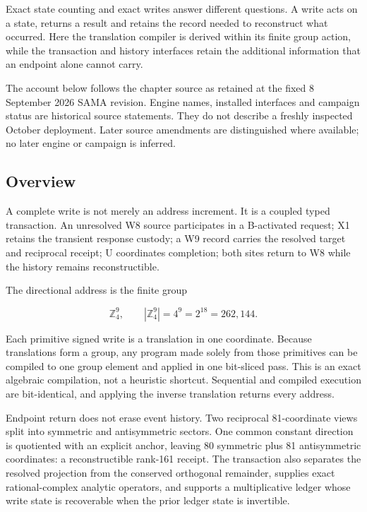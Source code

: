 \label{viii-ch04-the-algebra-of-a-complete-write}

Exact state counting and exact writes answer different questions. A
write acts on a state, returns a result and retains the record needed to
reconstruct what occurred. Here the translation compiler is derived
within its finite group action, while the transaction and history
interfaces retain the additional information that an endpoint alone
cannot carry.

The account below follows the chapter source as retained at the fixed 8
September 2026 SAMA revision. Engine names, installed interfaces and
campaign status are historical source statements. They do not describe a
freshly inspected October deployment. Later source amendments are
distinguished where available; no later engine or campaign is inferred.

\subsection{Overview}\label{viii-ch04-overview}

A complete write is not merely an address increment. It is a coupled
typed transaction. An unresolved W8 source participates in a B-activated
request; X1 retains the transient response custody; a W9 record carries
the resolved target and reciprocal receipt; U coordinates completion;
both sites return to W8 while the history remains reconstructible.

The directional address is the finite group

\[
\mathbb Z_4^9,
\qquad |\mathbb Z_4^9|=4^9=2^{18}=262{,}144.
\]

Each primitive signed write is a translation in one coordinate. Because
translations form a group, any program made solely from those primitives
can be compiled to one group element and applied in one bit-sliced pass.
This is an exact algebraic compilation, not a heuristic shortcut.
Sequential and compiled execution are bit-identical, and applying the
inverse translation returns every address.

Endpoint return does not erase event history. Two reciprocal
81-coordinate views split into symmetric and antisymmetric sectors. One
common constant direction is quotiented with an explicit anchor, leaving
80 symmetric plus 81 antisymmetric coordinates: a reconstructible
rank-161 receipt. The transaction also separates the resolved projection
from the conserved orthogonal remainder, supplies exact rational-complex
analytic operators, and supports a multiplicative ledger whose write
state is recoverable when the prior ledger state is invertible.

